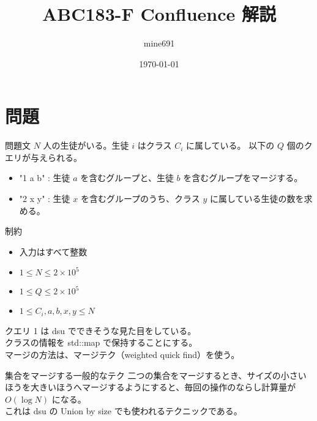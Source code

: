 \documentclass[dvipdfmx,12pt]{beamer}%
\title{ABC183-F Confluence 解説}
\author{mine691}
\date{\today}
\begin{document}
\maketitle
%

\section{問題}
\begin{frame} %
\begin{block}{問題文}
$ N $ 人の生徒がいる。生徒 $ i $ はクラス $ C_i $ に属している。
以下の $ Q $ 個のクエリが与えられる。
\begin{itemize}
	\item "1 a b" : 生徒 $ a $ を含むグループと、生徒 $ b $ を含むグループをマージする。
	\item "2 x y" : 生徒 $ x $ を含むグループのうち、クラス $ y $ に属している生徒の数を求める。
\end{itemize}
\end{block}

\begin{exampleblock}{制約}

	\begin{itemize}
		\item 入力はすべて整数
		\item $ 1 \leq N \leq 2 \times 10 ^ {5} $
		\item $ 1 \leq Q \leq 2 \times 10 ^ {5} $
		\item $ 1 \leq C_i, a, b, x, y \leq N $
	\end{itemize}

\end{exampleblock}
\end{frame}

\begin{frame}
クエリ 1 は dsu でできそうな見た目をしている。\\
クラスの情報を std::map で保持することにする。\\
マージの方法は、マージテク（weighted quick find）を使う。
\begin{alertblock}{集合をマージする一般的なテク}
	二つの集合をマージするとき、サイズの小さいほうを大きいほうへマージするようにすると、毎回の操作のならし計算量が $ O (\log N) $ になる。\\
	これは dsu の Union by size でも使われるテクニックである。 
\end{alertblock}

\end{frame}
\end{document}
